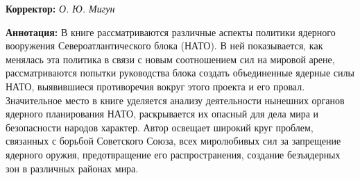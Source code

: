 \documentclass[12pt, a4paper, openany]{book}
\begin{document}
		{\bf Корректор:} \textit{О. Ю. Мигун}
	
		{\bf Аннотация:} В книге рассматриваются различные аспекты политики ядерного вооружения Североатлантического блока (НАТО). В ней показывается, как менялась эта политика в связи с новым соотношением сил на мировой арене, рассматриваются попытки руководства блока создать объединенные ядерные силы НАТО, выявившиеся противоречия вокруг этого проекта и его провал. Значительное место в книге уделяется анализу деятельности нынешних органов ядерного планирования НАТО, раскрывается их опасный для дела мира и безопасности народов характер. Автор освещает широкий круг проблем, связанных с борьбой Советского Союза, всех миролюбивых сил за запрещение ядерного оружия, предотвращение его распространения, создание безъядерных зон в различных районах мира. 
		\thispagestyle{empty} %

	
\end{document}
